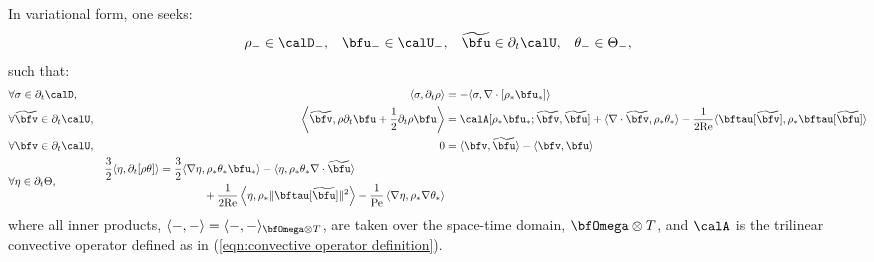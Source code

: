     In variational form, one seeks:
    \begin{align}
                  \rho_{-}  \in  \calD_{-},  &&
                  \bfu_{-}  \in  \calU_{-},  &&
          \widetilde{\bfu}  \in  \partial_{t}\calU,  &&
                \theta_{-}  \in  \Theta_{-},
    \end{align}
    such that:
    \begin{align}
        &\forall  \sigma  \in  \partial_{t}\calD,  &
            \langle\sigma, \partial_{t}\rho\rangle
            &=
            - \langle\sigma, \nabla\cdot\left[\rho_{*}\bfu_{*}\right]\rangle  \\
        &\forall  \widetilde{\bfv}  \in  \partial_{t}\calU,  &
            \left\langle\widetilde{\bfv}, \rho\partial_{t}\bfu
            + \frac{1}{2}\partial_{t}\rho\bfu\right\rangle
            &=
            \calA[\rho_{*}\bfu_{*}; \widetilde{\bfv}, \widetilde{\bfu}]
            + \langle\nabla\cdot\widetilde{\bfv}, \rho_{*}\theta_{*}\rangle
            - \frac{1}{2\rmRe}\langle\bftau[\widetilde{\bfv}], \rho_{*}\bftau[\widetilde{\bfu}]\rangle  \\
        &\forall  \bfv  \in  \partial_{t}\calU,  &
            0
            &=
            \langle\bfv, \widetilde{\bfu}\rangle
            - \langle\bfv, \bfu\rangle  \\
        &\forall  \eta  \in  \partial_{t}\Theta,  &  
        \begin{split}
            \frac{3}{2}\langle\eta, \partial_{t}[\rho\theta]\rangle
            &=
            \frac{3}{2}\langle\nabla\eta, \rho_{*}\theta_{*}\bfu_{*}\rangle
            - \langle\eta, \rho_{*}\theta_{*}\nabla\cdot\widetilde{\bfu}\rangle  \\
            &\qquad\qquad+ \frac{1}{2\rmRe}\left\langle\eta, \rho_{*}\|\bftau[\widetilde{\bfu}]\|^{2}\right\rangle
            - \frac{1}{\rmPe}\left\langle\nabla\eta, \rho_{*}\nabla\theta_{*}\right\rangle
        \end{split}
    \end{align}
    where all inner products, $\langle -, -\rangle  =  \langle -, -\rangle_{\bfOmega\otimes T}$, are taken over the space-time domain, $\bfOmega\otimes T$, and $\calA$ is the trilinear convective operator defined as in (\ref{eqn:convective operator definition}).

